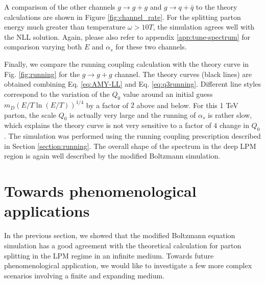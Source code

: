 \documentclass[aps, prc, reprint, amsmath, groupedaddress, nofootinbib]{revtex4-1}
\begin{document}
A comparison of the other channels $g\rightarrow g+g$ and $g\rightarrow q+\bar{q}$ to the theory calculations are shown in Figure \ref{fig:channel_rate}.
For the splitting parton energy much greater than temperature $\omega > 10 T$, the simulation agrees well with the NLL solution. 
Again, please also refer to appendix \ref{app:tune-spectrum} for comparison varying both $E$ and $\alpha_s$ for these two channels.


Finally, we compare the running coupling calculation with the theory curve in Fig. \ref{fig:running} for the $g\rightarrow g+g$ channel.
The theory curves (black lines) are obtained combining Eq. \ref{eq:AMY-LL} and Eq. \ref{eq:q3running}.
Different line styles correspond to the variation of the $Q_0$ value around an initial guess $m_D (E/T \ln(E/T) )^{1/4}$ by a factor of $2$ above and below.
For this 1 TeV parton, the scale $Q_0$ is actually very large and the running of $\alpha_s$ is rather slow, which explains the theory curve is not very sensitive to a factor of $4$ change in $Q_0$.
The simulation was performed using the running coupling prescription described in Section \ref{section:running}.
The overall shape of the spectrum in the deep LPM region is again well described by the modified Boltzmann simulation. 


\section{Towards phenomenological applications}\label{section:more}
In the previous section, we showed that the modified Boltzmann equation simulation has a good agreement with the theoretical calculation for parton splitting in the LPM regime in an infinite medium.
Towards future phenomenological application, we would like to investigate a few more complex scenarios involving a finite and expanding medium.
\end{document}
